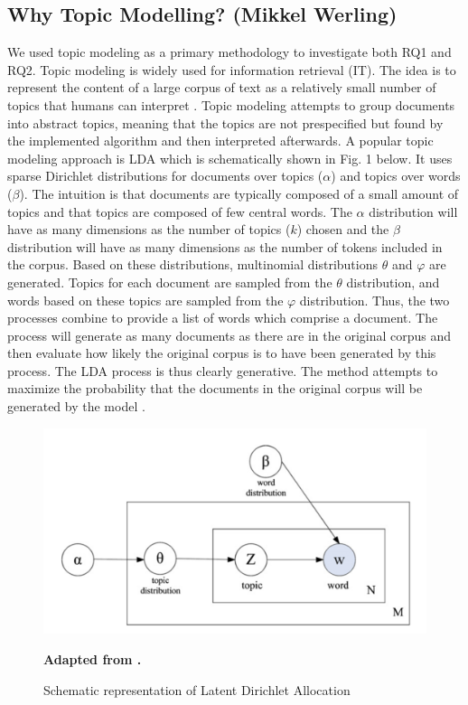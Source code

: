 \documentclass{article}
\begin{document}
    \subsection{Why Topic Modelling? (Mikkel Werling)}
    We used topic modeling as a primary methodology to investigate both RQ1 and RQ2. Topic modeling is widely used for information retrieval (IT). The idea is to represent the content of a large corpus of text as a relatively small number of topics that humans can interpret \cite{arun2010finding}. Topic modeling attempts to group documents into abstract topics, meaning that the topics are not prespecified but found by the implemented algorithm and then interpreted afterwards. 
A popular topic modeling approach is LDA \cite{arun2010finding,cao2009density} which is schematically shown in Fig. 1 below. It uses sparse Dirichlet distributions for documents over topics ($\alpha$) and topics over words ($\beta$). The intuition is that documents are typically composed of a small amount of topics and that topics are composed of few central words. The $\alpha$ distribution will have as many dimensions as the number of topics ($k$) chosen and the $\beta$ distribution will have as many dimensions as the number of tokens included in the corpus. Based on these distributions, multinomial distributions $\theta$ and $\varphi$ are generated. Topics for each document are sampled from the $\theta$ distribution, and words based on these topics are sampled from the $\varphi$ distribution. Thus, the two processes combine to provide a list of words which comprise a document. The process will generate as many documents as there are in the original corpus and then evaluate how likely the original corpus is to have been generated by this process. The LDA process is thus clearly generative. The method attempts to maximize the probability that the documents in the original corpus will be generated by the model \cite{cao2009density}.

\begin{figure}[H]
    \begin{centering}
    \includegraphics[width = \textwidth]{../Figure/cao_juan.PNG}
    \caption{Schematic representation of Latent Dirichlet Allocation}
    \end{centering}
    \begin{footnotesize} 
        \begin{center}
            \textbf{Adapted from .}
        \end{center}
    \end{footnotesize}
\end{figure}
\end{document}
